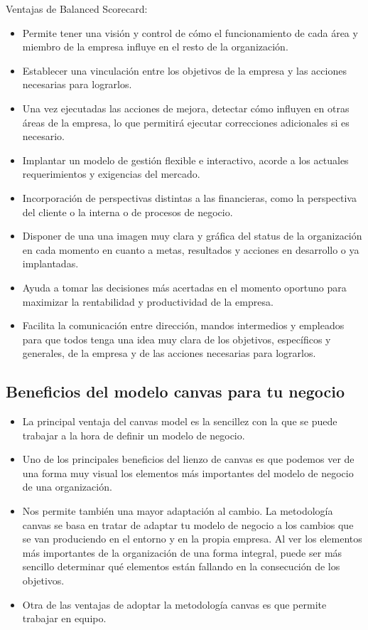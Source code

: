 \documentclass[preprint,12pt]{elsarticle}
\begin{document}
Ventajas de Balanced Scorecard:
\begin{itemize}
		\item Permite tener una visión y control de cómo el funcionamiento de cada área y miembro de la empresa influye en el resto de la organización.
		\item Establecer una vinculación entre los objetivos de la empresa y las acciones necesarias para lograrlos.
		\item Una vez ejecutadas las acciones de mejora, detectar cómo influyen en otras áreas de la empresa, lo que permitirá ejecutar correcciones adicionales si es necesario.
		\item Implantar un modelo de gestión flexible e interactivo, acorde a los actuales requerimientos y exigencias del mercado.
		\item Incorporación de perspectivas distintas a las financieras, como la perspectiva del cliente o la interna o de procesos de negocio.
		\item Disponer de una una imagen muy clara y gráfica del status de la organización en cada momento en cuanto a metas, resultados y acciones en desarrollo o ya implantadas.
		\item Ayuda a tomar las decisiones más acertadas en el momento oportuno para maximizar la rentabilidad y productividad de la empresa.
		\item Facilita la comunicación entre dirección, mandos intermedios y empleados para que todos tenga una idea muy clara de los objetivos, específicos y generales, de la empresa y de las acciones necesarias para lograrlos.
	\end{itemize}


	
	

\pagebreak

\subsection{Beneficios del modelo canvas para tu negocio}
\begin{itemize}	
\item La principal ventaja del canvas model es la sencillez con la que se puede trabajar a la hora de definir un modelo de negocio.
\item Uno de los principales beneficios del lienzo de canvas es que podemos ver de una forma muy visual los elementos más importantes del modelo de negocio de una organización.
\item Nos permite también una mayor adaptación al cambio. La metodología canvas se basa en tratar de adaptar tu modelo de negocio a los cambios que se van produciendo en el entorno y en la propia empresa. Al ver los elementos más importantes de la organización de una forma integral, puede ser más sencillo determinar qué elementos están fallando en la consecución de los objetivos.
\item Otra de las ventajas de adoptar la metodología canvas es que permite trabajar en equipo.
\end{itemize}
\end{document}
